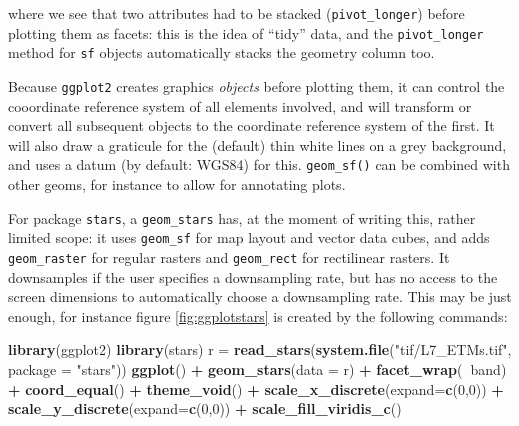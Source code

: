 \documentclass[]{book}
\newenvironment{Shaded}{\begin{snugshade}}{\end{snugshade}}
\newcommand{\DataTypeTok}[1]{\textcolor[rgb]{0.13,0.29,0.53}{#1}}
\newcommand{\DecValTok}[1]{\textcolor[rgb]{0.00,0.00,0.81}{#1}}
\newcommand{\KeywordTok}[1]{\textcolor[rgb]{0.13,0.29,0.53}{\textbf{#1}}}
\newcommand{\NormalTok}[1]{#1}
\newcommand{\OperatorTok}[1]{\textcolor[rgb]{0.81,0.36,0.00}{\textbf{#1}}}
\newcommand{\StringTok}[1]{\textcolor[rgb]{0.31,0.60,0.02}{#1}}
\begin{document}
where we see that two attributes had to be stacked (\texttt{pivot\_longer})
before plotting them as facets: this is the idea of ``tidy'' data,
and the \texttt{pivot\_longer} method for \texttt{sf} objects automatically stacks
the geometry column too.

Because \texttt{ggplot2} creates graphics \emph{objects} before plotting them,
it can control the cooordinate reference system of all elements
involved, and will transform or convert all subsequent objects to
the coordinate reference system of the first. It will also draw a
graticule for the (default) thin white lines on a grey background,
and uses a datum (by default: WGS84) for this. \texttt{geom\_sf()} can be
combined with other geoms, for instance to allow for annotating
plots.

For package \texttt{stars}, a \texttt{geom\_stars} has, at the moment of writing
this, rather limited scope: it uses \texttt{geom\_sf} for map layout and vector data
cubes, and adds \texttt{geom\_raster} for regular rasters and \texttt{geom\_rect}
for rectilinear rasters. It downsamples if the user specifies a
downsampling rate, but has no access to the screen dimensions to
automatically choose a downsampling rate. This may be just enough,
for instance figure
\ref{fig:ggplotstars} is created by the following commands:

\begin{Shaded}
\begin{Highlighting}[]
\KeywordTok{library}\NormalTok{(ggplot2)}
\KeywordTok{library}\NormalTok{(stars)}
\NormalTok{r =}\StringTok{ }\KeywordTok{read_stars}\NormalTok{(}\KeywordTok{system.file}\NormalTok{(}\StringTok{"tif/L7_ETMs.tif"}\NormalTok{, }\DataTypeTok{package =} \StringTok{"stars"}\NormalTok{))}
\KeywordTok{ggplot}\NormalTok{() }\OperatorTok{+}\StringTok{ }\KeywordTok{geom_stars}\NormalTok{(}\DataTypeTok{data =}\NormalTok{ r) }\OperatorTok{+}
\StringTok{        }\KeywordTok{facet_wrap}\NormalTok{(}\OperatorTok{~}\NormalTok{band) }\OperatorTok{+}\StringTok{ }\KeywordTok{coord_equal}\NormalTok{() }\OperatorTok{+}
\StringTok{        }\KeywordTok{theme_void}\NormalTok{() }\OperatorTok{+}
\StringTok{        }\KeywordTok{scale_x_discrete}\NormalTok{(}\DataTypeTok{expand=}\KeywordTok{c}\NormalTok{(}\DecValTok{0}\NormalTok{,}\DecValTok{0}\NormalTok{)) }\OperatorTok{+}\StringTok{ }
\StringTok{        }\KeywordTok{scale_y_discrete}\NormalTok{(}\DataTypeTok{expand=}\KeywordTok{c}\NormalTok{(}\DecValTok{0}\NormalTok{,}\DecValTok{0}\NormalTok{)) }\OperatorTok{+}
\StringTok{        }\KeywordTok{scale_fill_viridis_c}\NormalTok{()}
\end{Highlighting}
\end{Shaded}
\end{document}
